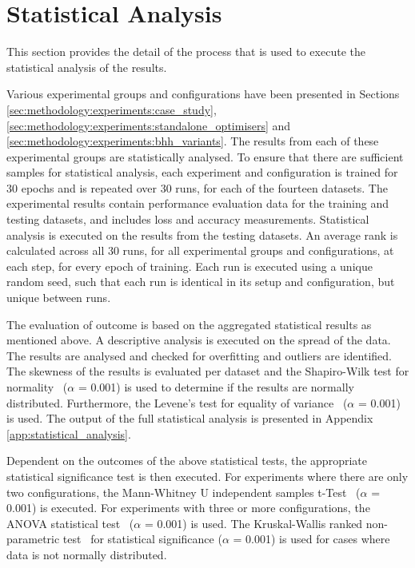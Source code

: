 \section{Statistical Analysis}
\label{sec:methodology:statistical_analysis}

This section provides the detail of the process that is used to execute the statistical analysis of the results.

Various experimental groups and configurations have been presented in Sections \ref{sec:methodology:experiments:case_study}, \ref{sec:methodology:experiments:standalone_optimisers} and \ref{sec:methodology:experiments:bhh_variants}. The results from each of these experimental groups are statistically analysed. To ensure that there are sufficient samples for statistical analysis, each experiment and configuration is trained for 30 epochs and is repeated over 30 runs, for each of the fourteen datasets. The experimental results contain performance evaluation data for the training and testing datasets, and includes loss and accuracy measurements. Statistical analysis is executed on the results from the testing datasets. An average rank is calculated across all 30 runs, for all experimental groups and configurations, at each step, for every epoch of training. Each run is executed using a unique random seed, such that each run is identical in its setup and configuration, but unique between runs.

The evaluation of outcome is based on the aggregated statistical results as mentioned above. A descriptive analysis is executed on the spread of the data. The results are analysed and checked for overfitting and outliers are identified. The skewness of the results is evaluated per dataset and the Shapiro-Wilk test for normality~\cite{ref:shapiro:1965} ($\alpha$ = 0.001) is used to determine if the results are normally distributed. Furthermore, the Levene's test for equality of variance~\cite{ref:levene:1961} ($\alpha$ = 0.001) is used. The output of the full statistical analysis is presented in Appendix \ref{app:statistical_analysis}.

Dependent on the outcomes of the above statistical tests, the appropriate statistical significance test is then executed. For experiments where there are only two configurations, the Mann-Whitney U independent samples t-Test~\cite{ref:mann:1947} ($\alpha$ = 0.001) is executed. For experiments with three or more configurations, the \acs{ANOVA} statistical test~\cite{ref:fisher:1921} ($\alpha$ = 0.001) is used. The Kruskal-Wallis ranked non-parametric test~\cite{ref:kruskal:1952} for statistical significance ($\alpha$ = 0.001) is used for cases where data is not normally distributed.

